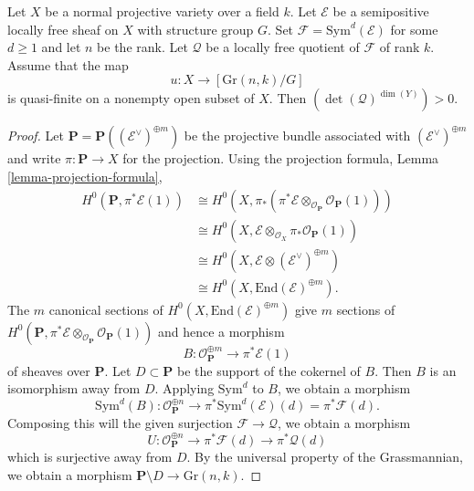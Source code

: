\begin{lemma}
\label{lemma-positive-self-intersection}
Let $X$ be a normal projective variety over a field $k$.
Let $\mathcal{E}$ be a semipositive locally free sheaf on $X$ with structure
group $G$.
Set $\mathcal{F} = \mathrm{Sym}^d(\mathcal{E})$ for some $d \geq 1$ and let $n$
be the rank.
Let $\mathcal{Q}$ be a locally free quotient of $\mathcal{F}$ of rank $k$.
Assume that the map
$$
u : X \to [\mathrm{Gr}(n,k)/G]
$$
is quasi-finite on a nonempty open subset of $X$.
Then $(\det(\mathcal{Q})^{\dim(Y)}) > 0$.
\end{lemma}

\begin{proof}
Let $\mathbf{P} = \mathbf{P}((\mathcal{E}^\vee)^{\oplus m})$ be the projective
bundle associated with $(\mathcal{E}^\vee)^{\oplus m}$ and write
$\pi : \mathbf{P} \to X$ for the projection.
Using the projection formula, Lemma \ref{lemma-projection-formula},
\begin{align*}
H^0(\mathbf{P}, \pi^*\mathcal{E}(1))
  & \cong
H^0(X, \pi_*(\pi^*\mathcal{E} \otimes_{\mathcal{O}_{\mathbf{P}}}
  \mathcal{O}_{\mathbf{P}}(1))) \\
  & \cong
H^0(X,\mathcal{E} \otimes_{\mathcal{O}_X} \pi_*\mathcal{O}_{\mathbf{P}}(1)) \\
  & \cong
H^0(X,\mathcal{E} \otimes (\mathcal{E}^\vee)^{\oplus m}) \\
  & \cong
H^0(X,\mathrm{End}(\mathcal{E})^{\oplus m}).
\end{align*}
The $m$ canonical sections of $H^0(X,\mathrm{End}(\mathcal{E})^{\oplus m})$
give $m$ sections of
$H^0(\mathbf{P}, \pi^*\mathcal{E}
  \otimes_{\mathcal{O}_{\mathbf{P}}} \mathcal{O}_{\mathbf{P}}(1))$ and hence
a morphism
$$
  B : \mathcal{O}_{\mathbf{P}}^{\oplus m} \to \pi^*\mathcal{E}(1)
$$
of sheaves over $\mathbf{P}$.
Let $D \subset \mathbf{P}$ be the support of the cokernel of $B$.
Then $B$ is an isomorphism away from $D$.
Applying $\mathrm{Sym}^d$ to $B$, we obtain a morphism
$$
  \mathrm{Sym}^d(B) : \mathcal{O}_{\mathbf{P}}^{\oplus n} \to
    \pi^*\mathrm{Sym}^d(\mathcal{E})(d) = \pi^*\mathcal{F}(d).
$$
Composing this will the given surjection $\mathcal{F} \to \mathcal{Q}$, we
obtain a morphism
$$
  U : \mathcal{O}_{\mathbf{P}}^{\oplus n} \to
        \pi^*\mathcal{F}(d) \to
        \pi^*\mathcal{Q}(d)
$$
which is surjective away from $D$.
By the universal property of the Grassmannian, we obtain a morphism
$\mathbf{P} \setminus D \to \mathrm{Gr}(n,k)$.


\end{proof}
